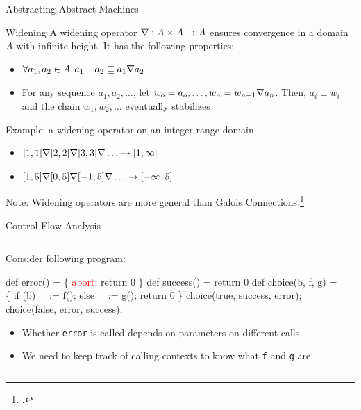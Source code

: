 \documentclass[aspectratio=169,14pt]{beamer}
\begin{document}
\begin{frame}{Abstracting Abstract Machines}
\end{frame}

\begin{frame}{Widening}
  \small
  A widening operator $\nabla : A \times A \to A$ ensures convergence
  in a domain $A$ with infinite height. It has the following
  properties:\vspace{-0.3em}
  \begin{itemize}\footnotesize
  \item $\forall a_1, a_2 \in A, a_1 \sqcup a_2 \sqsubseteq a_1 \nabla a_2$
  \item For any sequence $a_1, a_2, \ldots$, let $w_o = a_o, \ldots, w_n = w_{n-1} \nabla a_n$. Then, $a_i \sqsubseteq w_i$ and the chain $w_1, w_2, \ldots$ eventually stabilizes
  \end{itemize}\pause\vspace{-0.3em}
  \begin{exampleblock}{\small Example: a widening operator on an integer range domain}
    \vspace{-0.8em}
  \begin{itemize}[<+->]\footnotesize
  \item $[1,1] \nabla [2,2] \nabla [3,3] \nabla \ldots \to [1, \infty]$
  \item $[1,5] \nabla [0,5] \nabla [-1,5] \nabla \ldots \to [-\infty, 5]$
  \end{itemize}
\end{exampleblock}\vspace{-1.6em}\pause
Note: Widening operators are more general than Galois Connections.\footcite{cousot92comparing}\vspace{1em}
\end{frame}

\begin{frame}[fragile]{Control Flow Analysis}
  \footnotesize
  \begin{columns}
    \begin{column}{0.5\textwidth}
    Consider following program:\vspace{-1em}
  \begin{semiverbatim}\footnotesize
def error() = \{ \textcolor{red}{abort}; return 0 \}
def success() = return 0
def choice(b, f, g) = \{
  if (b) _ := \alert<3>{f}();
  else   _ := \alert<3>{g}();
  return 0
\}
choice(true, success, error);
choice(false, error, success);
\end{semiverbatim}\vspace{-2em}
\begin{itemize}
\item<3-> Whether \texttt{error} is called depends on parameters on different calls.
\item<4-> We need to keep track of calling contexts to know what \texttt{f} and \texttt{g} are.
\end{itemize}
\end{column}
\begin{column}{0.5\textwidth}
\end{column}
\end{columns}
\end{frame}
\end{document}
